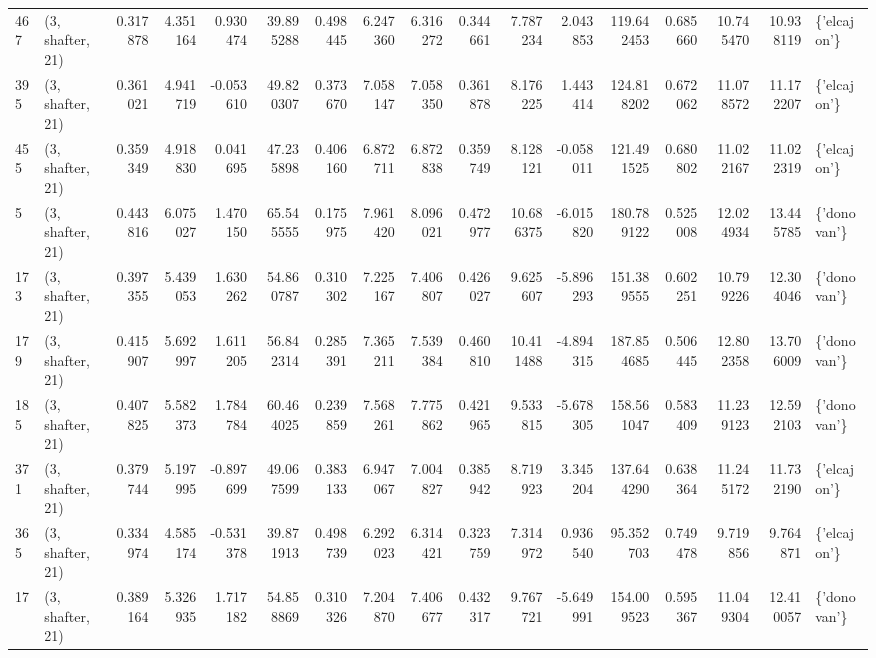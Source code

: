 \begin{tabular}{llrrrrrrrrrrrrrrl}
467 &  (3, shafter, 21) &   0.317878 &   4.351164 &   0.930474 &    39.895288 &   0.498445 &   6.247360 &   6.316272 &  0.344661 &   7.787234 &   2.043853 &   119.642453 &   0.685660 &  10.745470 &  10.938119 &  \{'elcajon'\} \\
395 &  (3, shafter, 21) &   0.361021 &   4.941719 &  -0.053610 &    49.820307 &   0.373670 &   7.058147 &   7.058350 &  0.361878 &   8.176225 &   1.443414 &   124.818202 &   0.672062 &  11.078572 &  11.172207 &  \{'elcajon'\} \\
455 &  (3, shafter, 21) &   0.359349 &   4.918830 &   0.041695 &    47.235898 &   0.406160 &   6.872711 &   6.872838 &  0.359749 &   8.128121 &  -0.058011 &   121.491525 &   0.680802 &  11.022167 &  11.022319 &  \{'elcajon'\} \\
5   &  (3, shafter, 21) &   0.443816 &   6.075027 &   1.470150 &    65.545555 &   0.175975 &   7.961420 &   8.096021 &  0.472977 &  10.686375 &  -6.015820 &   180.789122 &   0.525008 &  12.024934 &  13.445785 &  \{'donovan'\} \\
173 &  (3, shafter, 21) &   0.397355 &   5.439053 &   1.630262 &    54.860787 &   0.310302 &   7.225167 &   7.406807 &  0.426027 &   9.625607 &  -5.896293 &   151.389555 &   0.602251 &  10.799226 &  12.304046 &  \{'donovan'\} \\
179 &  (3, shafter, 21) &   0.415907 &   5.692997 &   1.611205 &    56.842314 &   0.285391 &   7.365211 &   7.539384 &  0.460810 &  10.411488 &  -4.894315 &   187.854685 &   0.506445 &  12.802358 &  13.706009 &  \{'donovan'\} \\
185 &  (3, shafter, 21) &   0.407825 &   5.582373 &   1.784784 &    60.464025 &   0.239859 &   7.568261 &   7.775862 &  0.421965 &   9.533815 &  -5.678305 &   158.561047 &   0.583409 &  11.239123 &  12.592103 &  \{'donovan'\} \\
371 &  (3, shafter, 21) &   0.379744 &   5.197995 &  -0.897699 &    49.067599 &   0.383133 &   6.947067 &   7.004827 &  0.385942 &   8.719923 &   3.345204 &   137.644290 &   0.638364 &  11.245172 &  11.732190 &  \{'elcajon'\} \\
365 &  (3, shafter, 21) &   0.334974 &   4.585174 &  -0.531378 &    39.871913 &   0.498739 &   6.292023 &   6.314421 &  0.323759 &   7.314972 &   0.936540 &    95.352703 &   0.749478 &   9.719856 &   9.764871 &  \{'elcajon'\} \\
17  &  (3, shafter, 21) &   0.389164 &   5.326935 &   1.717182 &    54.858869 &   0.310326 &   7.204870 &   7.406677 &  0.432317 &   9.767721 &  -5.649991 &   154.009523 &   0.595367 &  11.049304 &  12.410057 &  \{'donovan'\} \\

\end{tabular}
